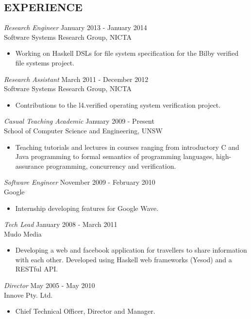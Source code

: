 \documentclass[line,margin]{res}
\begin{document}
\begin{resume}
\section{EXPERIENCE} {\sl Research Engineer} \hfill January 2013 - January 2014 \\
                 Software Systems Research Group, NICTA
                 \begin{itemize}  \itemsep -2pt %
                \item  Working on Haskell DSLs for file system specification
                       for the Bilby verified file systems project.
                \end{itemize}
 
                {\sl Research Assistant} \hfill March 2011 - December 2012 \\
                 Software Systems Research Group, NICTA
                 \begin{itemize}  \itemsep -2pt %
                 \item Contributions to the l4.verified operating system verification project.
                 \end{itemize} 
                {\sl Casual Teaching Academic} \hfill January 2009 - Present \\
                 School of Computer Science and Engineering, UNSW
                  \begin{itemize}
                    \item Teaching tutorials and lectures in courses ranging from introductory C and Java programming to
                         formal semantics of programming languages, high-assurance programming,
                         concurrency and verification.
                   \end{itemize} 
 
                {\sl Software Engineer} \hfill November 2009 - February 2010\\
                 Google
                  \begin{itemize}
                       \item Internship developing features for Google Wave.
                   \end{itemize} 

                {\sl Tech Lead} \hfill January 2008 - March 2011\\
                 Mudo Media
                  \begin{itemize}
                       \item Developing a web and facebook application for travellers to share information with each other. Developed using Haskell web frameworks (Yesod) and a RESTful API.
                   \end{itemize} 
             
                {\sl Director} \hfill May 2005 - May 2010\\
                  Innove Pty. Ltd.
                  \begin{itemize}
                       \item Chief Technical Officer, Director and Manager.
                   \end{itemize} 
 

\end{resume}
\end{document}
